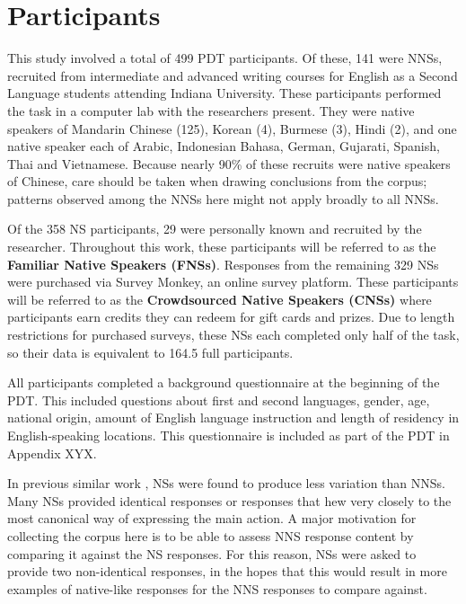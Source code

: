 \section{Participants}
\label{sec:participants}

This study involved a total of 499 PDT participants. Of these, 141 were NNSs, recruited from intermediate and advanced writing courses for English as a Second Language students attending Indiana University. These participants performed the task in a computer lab with the researchers present. They were native speakers of Mandarin Chinese (125), Korean (4), Burmese (3), Hindi (2), and one native speaker each of Arabic, Indonesian Bahasa, German, Gujarati, Spanish, Thai and Vietnamese. Because nearly 90\% of these recruits were native speakers of Chinese, care should be taken when drawing conclusions from the corpus; patterns observed among the NNSs here might not apply broadly to all NNSs. 

Of the 358 NS participants, 29 were personally known and recruited by the researcher. Throughout this work, these participants will be referred to as the \textbf{Familiar Native Speakers (FNSs)}. Responses from the remaining 329 NSs were purchased via Survey Monkey, an online survey platform. These participants will be referred to as the \textbf{Crowdsourced Native Speakers (CNSs)} where participants earn credits they can redeem for gift cards and prizes. Due to length restrictions for purchased surveys, these NSs each completed only half of the task, so their data is equivalent to 164.5 full participants.

All participants completed a background questionnaire at the beginning of the PDT. This included questions about first and second languages, gender, age, national origin, amount of English language instruction and length of residency in English-speaking locations. This questionnaire is included as part of the PDT in Appendix XYX. 

In previous similar work \citep{king:dickinson:13},
NSs were found to produce less variation than NNSs. Many NSs provided identical responses or responses that hew very closely to the most canonical way of expressing the main action. A major motivation for collecting the corpus here is to be able to assess NNS response content by comparing it against the NS responses. For this reason, NSs were asked to provide two non-identical responses, in the hopes that this would result in more examples of native-like responses for the NNS responses to compare against.

